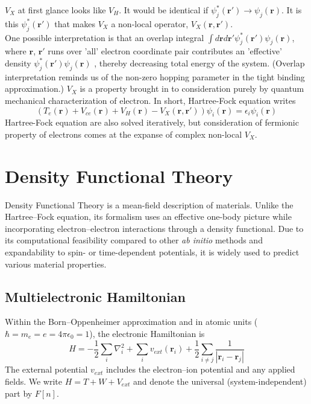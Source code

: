 \documentclass{article}
\begin{document}
$V_{X}$ at first glance looks like $V_{H}$. It would be identical if $\psi_{j}^{*}(\mathbf{r'})\to\psi_{j}(\mathbf{r})$. It is this $\psi_{j}^{*}(\mathbf{r'})$ that makes $V_{X}$ a non-local operator, $V_{X}(\mathbf{r},\mathbf{r'})$.\\
One possible interpretation is that an overlap integral $\int d\mathbf{r}d\mathbf{r}'\psi_{j}^{*}(\mathbf{r'})\psi_{j}(\mathbf{r})$, where $\mathbf{r}$, $\mathbf{r'}$ runs over 'all' electron coordinate pair contributes an 'effective' density $\psi_{j}^{*}(\mathbf{r'})\psi_{j}(\mathbf{r})$ , thereby decreasing total energy of the system. (Overlap interpretation reminds us of the non-zero hopping parameter in the tight binding approximation.) $V_{X}$ is a property brought in to consideration purely by quantum mechanical characterization of electron. In short, Hartree-Fock equation writes
\begin{equation}
	(T_{e}(\mathbf{r})+V_{ce}(\mathbf{r})+V_{H}(\mathbf{r})-V_{X}(\mathbf{r},\mathbf{r'}))\psi_{i}(\mathbf{r})=\epsilon_{i}\psi_{i}(\mathbf{r})\label{hartreecontracted}
\end{equation}
Hartree-Fock equation are also solved iteratively, but consideration of fermionic property of electrons comes at the expanse of complex non-local $V_{X}$.
\\%
\section*{Density Functional Theory}
Density Functional Theory is a mean-field description of materials. Unlike the Hartree--Fock equation, its formalism uses an effective one-body picture while incorporating electron--electron interactions through a density functional. Due to its computational feasibility compared to other \textit{ab initio} methods and expandability to spin- or time-dependent potentials, it is widely used to predict various material properties.\\
\subsection*{Multielectronic Hamiltonian}
Within the Born--Oppenheimer approximation and in atomic units ($\hbar=m_e=e=4\pi\epsilon_0=1$), the electronic Hamiltonian is
\begin{equation}
	H=-\frac{1}{2}\sum_i\nabla_i^2+\sum_i v_{ext}(\mathbf{r}_i)+\frac{1}{2}\sum_{i\neq j}\frac{1}{|\mathbf{r}_i-\mathbf{r}_j|}
\end{equation}
The external potential $v_{ext}$ includes the electron--ion potential and any applied fields. We write $H=T+W+V_{ext}$ and denote the universal (system-independent) part by $F[n]$.
\end{document}
